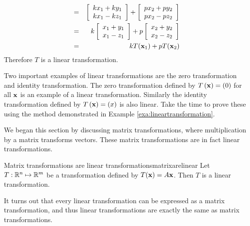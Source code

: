 \begin{solution}
\begin{eqnarray*}
&=& \left[\begin{array}{c} kx_1 + ky_1 \\ kx_1 - kz_1 \end{array}\right] + \left[ \begin{array}{c} px_2 + py_2 \\  px_2 - pz_2 \end{array}\right] \\
&=& k \left[\begin{array}{c} x_1 + y_1 \\ x_1 - z_1 \end{array}\right] + p \left[ \begin{array}{c} x_2 + y_2 \\  x_2 - z_2 \end{array}\right] \\
&=& k T({\bf x}_1) + p T({\bf x}_2) 
\end{eqnarray*}
Therefore $T$ is a linear transformation. 
\end{solution}

Two important examples of linear transformations are the zero transformation and identity transformation. The zero transformation defined by $T\left( {\bf x} \right) = {\bf (}0)$ for all ${\bf x}$ is an example of a linear transformation. Similarly the identity transformation defined by $T\left( {\bf x} \right) = {\bf (}x)$ is also linear. Take the time to prove these using the method demonstrated in Example \ref{exa:lineartransformation}.

We began this section by discussing matrix transformations, where multiplication by a matrix transforms vectors. These matrix transformations are in fact linear transformations. 

\begin{theorem}{Matrix transformations are linear transformations}{matrixarelinear}
Let $T:\mathbb{R}^{n}\mapsto \mathbb{R}^{m}$ be a transformation defined by $T({\bf x}) = A{\bf x}$. Then $T$ is a linear transformation. 
\end{theorem}

It turns out that every linear transformation can be expressed as a matrix transformation, and thus linear transformations are exactly the same as matrix transformations. 
